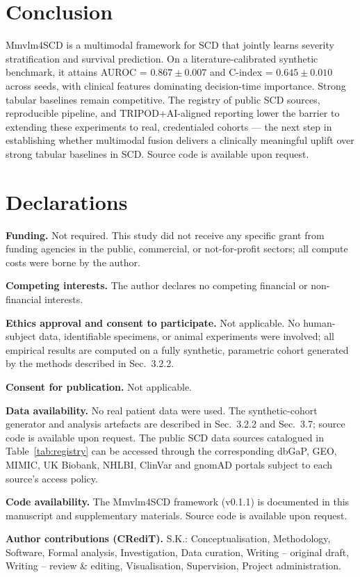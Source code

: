 \documentclass[11pt,a4paper]{article}
\begin{document}
\section{Conclusion}
Mmvlm4SCD is a multimodal framework for SCD that jointly learns severity stratification and survival prediction. On a literature-calibrated synthetic benchmark, it attains AUROC = $0.867 \pm 0.007$ and C-index = $0.645 \pm 0.010$ across seeds, with clinical features dominating decision-time importance. Strong tabular baselines remain competitive. The registry of public SCD sources, reproducible pipeline, and TRIPOD+AI-aligned reporting lower the barrier to extending these experiments to real, credentialed cohorts --- the next step in establishing whether multimodal fusion delivers a clinically meaningful uplift over strong tabular baselines in SCD. Source code is available upon request.
\section*{Declarations}\nolinenumbers
\noindent\textbf{Funding.} Not required. This study did not receive any specific grant from funding agencies in the public, commercial, or not-for-profit sectors; all compute costs were borne by the author.

\noindent\textbf{Competing interests.} The author declares no competing financial or non-financial interests.

\noindent\textbf{Ethics approval and consent to participate.} Not applicable. No human-subject data, identifiable specimens, or animal experiments were involved; all empirical results are computed on a fully synthetic, parametric cohort generated by the methods described in Sec.~3.2.2.

\noindent\textbf{Consent for publication.} Not applicable.

\noindent\textbf{Data availability.} No real patient data were used. The synthetic-cohort generator and analysis artefacts are described in Sec.~3.2.2 and Sec.~3.7; source code is available upon request. The public SCD data sources catalogued in Table~\ref{tab:registry} can be accessed through the corresponding dbGaP, GEO, MIMIC, UK Biobank, NHLBI, ClinVar and gnomAD portals subject to each source's access policy.

\noindent\textbf{Code availability.} The Mmvlm4SCD framework (v0.1.1) is documented in this manuscript and supplementary materials. Source code is available upon request.

\noindent\textbf{Author contributions (CRediT).} S.K.: Conceptualisation, Methodology, Software, Formal analysis, Investigation, Data curation, Writing -- original draft, Writing -- review \& editing, Visualisation, Supervision, Project administration.
\end{document}
